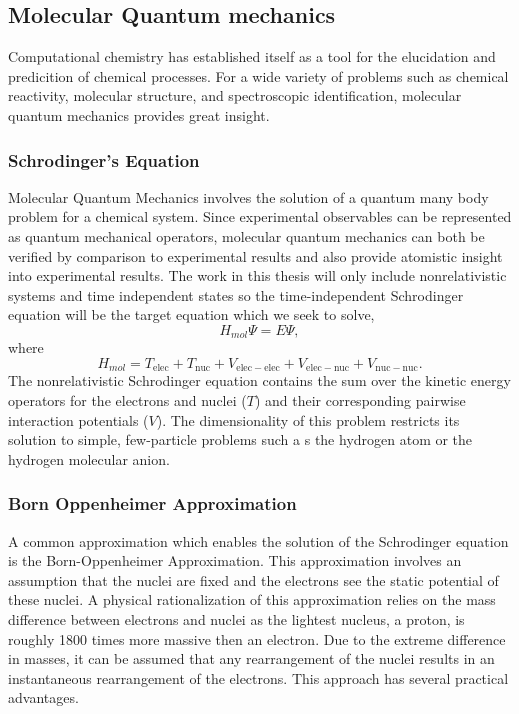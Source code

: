 \subsection{Molecular Quantum mechanics}
Computational chemistry has established itself as a tool for the elucidation and predicition of chemical processes.
For a wide variety of problems such as chemical reactivity, molecular structure, and spectroscopic identification, molecular quantum mechanics provides great insight.

\subsubsection{Schrodinger's Equation}
Molecular Quantum Mechanics  involves the solution of a quantum many body problem for a chemical system. Since experimental observables can be represented as quantum mechanical operators, molecular quantum mechanics can both be verified by comparison to experimental results and also provide atomistic insight into experimental results.
The work in this thesis will only include nonrelativistic systems and time independent states so the time-independent Schrodinger equation will be the target equation which we seek to solve,
\begin{equation}
H_{mol} \Psi = E \Psi,
\end{equation}
where
\begin{equation}
H_{mol} = T_{\mathrm{elec}} + T_{\mathrm{nuc}} + V_{\mathrm{elec-elec}} + V_{\mathrm{elec-nuc}} + V_{\mathrm{nuc-nuc}}.
\end{equation}
The nonrelativistic Schrodinger equation contains the sum over the kinetic energy operators for the electrons and nuclei ($T$) and their corresponding pairwise interaction potentials ($V$).
The dimensionality of this problem restricts its solution to simple, few-particle problems such a s the hydrogen atom or the hydrogen molecular anion.

\subsubsection{Born Oppenheimer Approximation}
A common approximation which enables the solution of the Schrodinger equation is the Born-Oppenheimer Approximation.
This approximation involves an assumption that the nuclei are fixed and the electrons see the static potential of these nuclei.
A physical rationalization of this approximation relies on the mass difference between electrons and nuclei as the lightest nucleus, a proton, is roughly 1800 times more massive then an electron.
Due to the extreme difference in masses, it can be assumed that any rearrangement of the nuclei results in an instantaneous rearrangement of the electrons.
This approach has several practical advantages.

